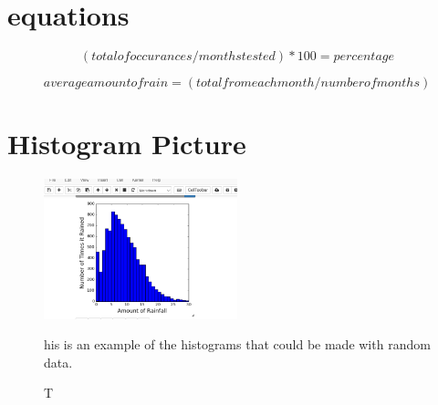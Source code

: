 \documentclass[twocolumn]{revtex4}
\begin{document}
\section{equations}
$$(totalofoccurances/monthstested)*100 =percentage$$

$$averageamountofrain= (totalfromeachmonth/numberofmonths)$$

\section {Histogram Picture}
\begin{figure} [h]
\centering 
\includegraphics[width=0.5\textwidth] {histogram for final.png}
\caption This is an example of the histograms that could be made with random data.
\end{figure}
\end{document}
